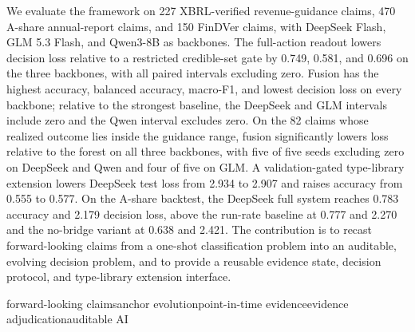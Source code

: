 \documentclass[12pt,openany]{ctexbook}
\begin{document}
{\hspace*{2em}We evaluate the framework on 227 XBRL-verified revenue-guidance claims, 470 A-share annual-report claims, and 150 FinDVer claims, with DeepSeek Flash, GLM 5.3 Flash, and Qwen3-8B as backbones. The full-action readout lowers decision loss relative to a restricted credible-set gate by 0.749, 0.581, and 0.696 on the three backbones, with all paired intervals excluding zero. Fusion has the highest accuracy, balanced accuracy, macro-F1, and lowest decision loss on every backbone; relative to the strongest baseline, the DeepSeek and GLM intervals include zero and the Qwen interval excludes zero. On the 82 claims whose realized outcome lies inside the guidance range, fusion significantly lowers loss relative to the forest on all three backbones, with five of five seeds excluding zero on DeepSeek and Qwen and four of five on GLM. A validation-gated type-library extension lowers DeepSeek test loss from 2.934 to 2.907 and raises accuracy from 0.555 to 0.577. On the A-share backtest, the DeepSeek full system reaches 0.783 accuracy and 2.179 decision loss, above the run-rate baseline at 0.777 and 2.270 and the no-bridge variant at 0.638 and 2.421. The contribution is to recast forward-looking claims from a one-shot classification problem into an auditable, evolving decision problem, and to provide a reusable evidence state, decision protocol, and type-library extension interface.\par
}
\vspace{0.4cm}
 {\arial{}\selectfont forward-looking claims\hspace{0.8em}anchor evolution\hspace{0.8em}point-in-time evidence\hspace{0.8em}evidence adjudication\hspace{0.8em}auditable AI}

\clearpage
\tableofcontents
{}
\clearpage
{}
{}
\listoffigures
{}
\clearpage
{}
{}
\listoftables
{}
\clearpage

\mainmatter
{}
\setlength{\parindent}{2em}



\end{document}
